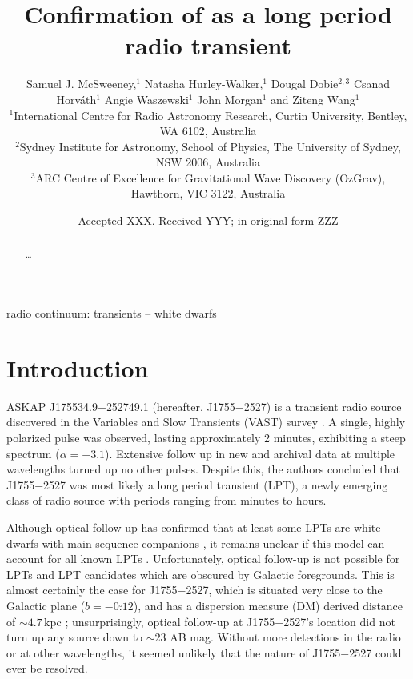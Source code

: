 \documentclass[fleqn,usenatbib]{mnras}
\title[Confirmation of \src{} as LPT]{Confirmation of \srcfull{} as a long period radio transient}
\author[S. J. McSweeney et al.]{
Samuel J. McSweeney,$^{1}$
Natasha Hurley-Walker,$^{1}$
Dougal Dobie$^{2,3}$
Csanad Horv\'{a}th$^{1}$
Angie Waszewski$^{1}$
John Morgan$^{1}$
and Ziteng Wang$^{1}$
\\
$^{1}$International Centre for Radio Astronomy Research, Curtin University, Bentley, WA 6102, Australia\\
$^{2}$Sydney Institute for Astronomy, School of Physics, The University of Sydney, NSW 2006, Australia\\
$^{3}$ARC Centre of Excellence for Gravitational Wave Discovery (OzGrav), Hawthorn, VIC 3122, Australia
}
\date{Accepted XXX. Received YYY; in original form ZZZ}
\newcommand{\src}{J1755$-$2527}
\newcommand{\srcfull}{ASKAP J175534.9$-$252749.1}
\begin{document}
\label{firstpage}
\pagerange{\pageref{firstpage}--\pageref{lastpage}}
\maketitle

\begin{abstract}
\dots
\end{abstract}

\begin{keywords}
radio continuum: transients -- white dwarfs
\end{keywords}



\section{Introduction} \label{sec:introduction}

\srcfull{} (hereafter, \src{}) is a transient radio source discovered in the Variables and Slow Transients (VAST) survey \citep[][hereafter ]{2024MNRAS.535..909D}.
A single, highly polarized pulse was observed, lasting approximately 2 minutes, exhibiting a steep spectrum ($\alpha = -3.1$).
Extensive follow up in new and archival data at multiple wavelengths turned up no other pulses.
Despite this, the authors concluded that \src{} was most likely a long period transient (LPT), a newly emerging class of radio source with periods ranging from minutes to hours.

Although optical follow-up has confirmed that at least some LPTs are white dwarfs with main sequence companions \citep{2024arXiv240811536D,2025arXiv250103315R}, it remains unclear if this model can account for all known LPTs \citep[e.g.][]{2022ApJ...940...72R,Lee2025}.
Unfortunately, optical follow-up is not possible for LPTs and LPT candidates which are obscured by Galactic foregrounds.
This is almost certainly the case for \src{}, which is situated very close to the Galactic plane ($b = -0\overset{\circ}{.}12$), and has a dispersion measure (DM) derived distance of ${\sim}4.7\,$kpc ; unsurprisingly, optical follow-up at \src{}'s location did not turn up any source down to ${\sim}23$ AB mag.
Without more detections in the radio or at other wavelengths, it seemed unlikely that the nature of \src{} could ever be resolved.
\end{document}
